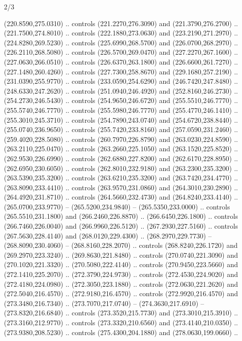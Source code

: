 \begin{flagdescription}{2/3}
\begin{scope}[xshift=0.5\flaglength,yshift=0.5\flagwidth,scale=\stretchfactor]
\begin{scope}[scale=0.001645\flagwidth,yshift=65mm,xshift=-63mm]
\begin{scope}[y=0.80pt, x=0.80pt, yscale=-1,]
\begin{scope}[cm={{1.33333,0.0,0.0,1.33333,(0.0,1e-05)}}]
  (220.8590,275.0310) .. controls (221.2270,276.3090) and (221.3790,276.2700) ..
  (221.7500,274.8010) .. controls (222.1880,273.0630) and (223.2190,271.2970) ..
  (224.8280,269.5230) .. controls (225.6990,268.5700) and (226.0700,268.2970) ..
  (226.2110,268.5080) .. controls (226.5700,269.0470) and (227.2270,267.1600) ..
  (227.0630,266.0510) .. controls (226.6370,263.1800) and (226.6600,261.7270) ..
  (227.1480,260.4260) .. controls (227.7300,258.8670) and (229.1680,257.2190) ..
  (231.0390,255.9770) .. controls (233.0590,254.6290) and (246.7420,247.8480) ..
  (248.6330,247.2620) .. controls (251.0940,246.4920) and (252.8160,246.2730) ..
  (254.2730,246.5430) .. controls (254.9650,246.6720) and (255.5510,246.7770) ..
  (255.5740,246.7770) .. controls (255.5980,246.7770) and (255.4770,246.1410) ..
  (255.3010,245.3710) .. controls (254.7890,243.0740) and (254.6720,238.8440) ..
  (255.0740,236.9650) .. controls (255.7420,233.8160) and (257.0590,231.2460) ..
  (259.4020,228.5080) .. controls (260.7970,226.8790) and (263.0230,224.8590) ..
  (263.2110,225.0470) .. controls (263.2660,225.1050) and (263.1520,225.8520) ..
  (262.9530,226.6990) .. controls (262.6880,227.8200) and (262.6170,228.8950) ..
  (262.6950,230.6050) .. controls (262.8010,232.9180) and (263.2300,235.3200) ..
  (263.5390,235.3200) .. controls (263.6210,235.3200) and (263.7420,234.4770) ..
  (263.8090,233.4410) .. controls (263.9570,231.0860) and (264.3010,230.2890) ..
  (264.4920,231.8710) .. controls (264.5660,232.4730) and (264.8240,233.4140) ..
  (265.0700,233.9770) -- (265.5200,234.9840) -- (265.5350,233.0000) .. controls
  (265.5510,231.1800) and (266.2460,226.8870) .. (266.6450,226.1800) .. controls
  (266.7460,226.0040) and (266.9960,226.5120) .. (267.2930,227.5160) .. controls
  (267.5630,228.4140) and (268.0120,229.4300) .. (268.2970,229.7730) --
  (268.8090,230.4060) -- (268.8160,228.2070) .. controls (268.8240,226.1720) and
  (269.2970,223.3240) .. (269.8630,221.8480) .. controls (270.0740,221.3090) and
  (270.1020,221.3320) .. (270.5080,222.4140) .. controls (270.9450,223.5660) and
  (272.1410,225.2070) .. (272.3790,224.9730) .. controls (272.4530,224.9020) and
  (272.4180,224.0980) .. (272.3050,223.1880) .. controls (272.0630,221.2620) and
  (272.5040,216.4570) .. (272.9180,216.4570) .. controls (272.9920,216.4570) and
  (273.3480,216.7340) .. (273.7070,217.0740) -- (274.3630,217.6910) --
  (273.8320,216.6840) .. controls (273.3520,215.7730) and (273.3010,215.3910) ..
  (273.3160,212.9770) .. controls (273.3320,210.6560) and (273.4140,210.0350) ..
  (273.9380,208.5230) .. controls (275.4300,204.1880) and (278.0630,199.0660) ..

\end{scope}
\end{scope}
\end{scope}
\end{scope}
\end{flagdescription}
